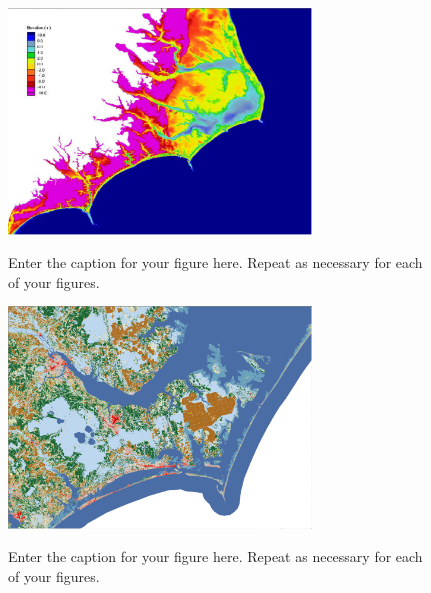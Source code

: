 \documentclass[12pt]{article}
\begin{document}
\begin{figure}[t]
  \noindent\includegraphics[width=19pc,angle=0]{ncv6b_bathy.pdf}\\
  \caption{Enter the caption for your figure here.  Repeat as
  necessary for each of your figures.}\label{f4}
\end{figure}

\begin{figure}[t]
  \noindent\includegraphics[width=19pc,angle=0]{nc_landcover.pdf}\\
  \caption{Enter the caption for your figure here.  Repeat as
  necessary for each of your figures.}\label{f5}
\end{figure}
\end{document}
